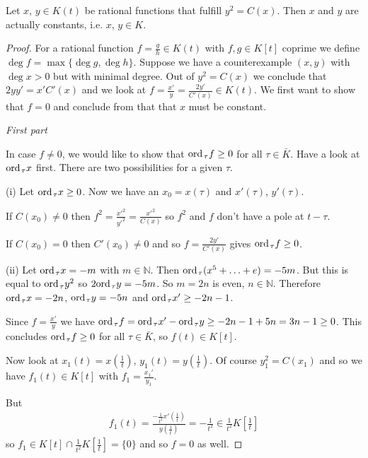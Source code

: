 \documentclass[english,11pt,a4paper]{article}
\begin{document}
\setcounter{theorem}{0}

\begin{theorem}
  Let $x$, $y \in K(t)$ be rational functions that fulfill $y^2 = C(x)$. Then $x$ and $y$ are actually constants, i.e. $x$, $y \in K$.
  \begin{proof}
    For a rational function $f= \frac g h \in K(t)$ with $f, g \in K[t]$ coprime we define $\deg f = \max \{ \deg g , \deg h \}$. Suppose we have a counterexample $(x,y)$ with $\deg x > 0$ but with minimal degree. Out of $y^2 = C(x)$ we conclude that $2y y' = x' C'(x)$ and we look at $f = \frac{x'}{y} = \frac{2y'}{C'(x)} \in K(t)$. We first want to show that $f = 0$ and conclude from that that $x$ must be constant.

    \textit{First part}

    In case $f \neq 0$, we would like to show that $\text{ord\hspace{0.4mm}}_{\tau} f \geq 0$ for all $\tau \in \bar K$. Have a look at $\text{ord\hspace{0.4mm}}_{\tau} x$ first. There are two possibilities for a given $\tau$.

    (i) Let $\text{ord\hspace{0.4mm}}_{\tau} x \geq 0$. Now we have an $x_0 = x(\tau)$ and $x'(\tau)$, $y'(\tau)$.

    If $C(x_0) \neq 0$ then $f^2=\frac{x'^2}{y'^2} = \frac{x'^2}{C(x)}$ so $f^2$ and $f$ don't have a pole at $t-\tau$.

    If $C(x_0) = 0$ then $C'(x_0) \neq 0$ and so $f= \frac{2y'}{C'(x)}$ gives $\text{ord\hspace{0.4mm}}_\tau f \geq 0$.

    (ii) Let $\text{ord\hspace{0.4mm}}_{\tau} x = -m$ with $m \in \mathds{N}$. Then $\text{ord\hspace{0.4mm}}_\tau (x^5+\ldots+e) = -5m$. But this is equal to $\text{ord\hspace{0.4mm}}_\tau y^2$ so $2 \text{ord\hspace{0.4mm}}_\tau y = -5m$. So $m = 2n$ is even, $n \in \mathds{N}$. Therefore $\text{ord\hspace{0.4mm}}_{\tau} x = -2n$, $\text{ord\hspace{0.4mm}}_{\tau} y = -5n$ and $\text{ord\hspace{0.4mm}}_{\tau} x' \geq -2n-1$.

    Since $f = \frac{x'}{y}$ we have $\text{ord\hspace{0.4mm}}_\tau f = \text{ord\hspace{0.4mm}}_\tau x' - \text{ord\hspace{0.4mm}}_\tau y \geq -2n -1 +5n = 3n -1 \geq 0$. This concludes $\text{ord\hspace{0.4mm}}_{\tau} f \geq 0$ for all $\tau \in \bar K$, so $f(t) \in K[t]$.

    Now look at $x_1(t) = x(\frac 1 t )$, $y_1(t) = y(\frac 1 t )$. Of course $y_1^2 = C(x_1)$ and so we have $f_1(t) \in K[t]$ with $f_1 = \frac{x_1'}{y_1}$.

    But
    \begin{align*}
      f_1(t) = \frac{-\frac{1}{t^2} x'(\frac 1 t)}{y(\frac 1 t )} = - \frac{1}{t^2} \in \frac{1}{t^2} K[\frac{1}{t}]
    \end{align*}
    so $f_1 \in K[t] \cap \frac{1}{t^2} K[\frac{1}{t}] = \{0 \}$ and so $f= 0$ as well.


\end{proof}
\end{theorem}
\end{document}
